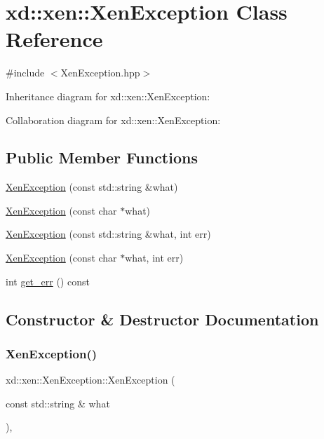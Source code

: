 \hypertarget{classxd_1_1xen_1_1_xen_exception}{}\section{xd\+:\+:xen\+:\+:Xen\+Exception Class Reference}
\label{classxd_1_1xen_1_1_xen_exception}


{\ttfamily \#include $<$Xen\+Exception.\+hpp$>$}



Inheritance diagram for xd\+:\+:xen\+:\+:Xen\+Exception\+:


Collaboration diagram for xd\+:\+:xen\+:\+:Xen\+Exception\+:
\subsection*{Public Member Functions}
\begin{DoxyCompactItemize}
\item 
\mbox{\hyperlink{classxd_1_1xen_1_1_xen_exception_ace9d3d9006e69ef09baf41800c7db3d8}{Xen\+Exception}} (const std\+::string \&what)
\item 
\mbox{\hyperlink{classxd_1_1xen_1_1_xen_exception_a10121fdee15b3aeebde90123e32f113b}{Xen\+Exception}} (const char $\ast$what)
\item 
\mbox{\hyperlink{classxd_1_1xen_1_1_xen_exception_a35675029462ffd76dd1ecec315e8242f}{Xen\+Exception}} (const std\+::string \&what, int err)
\item 
\mbox{\hyperlink{classxd_1_1xen_1_1_xen_exception_a642f932b89e63f022f35f66aead6a813}{Xen\+Exception}} (const char $\ast$what, int err)
\item 
int \mbox{\hyperlink{classxd_1_1xen_1_1_xen_exception_a4595157c80ab52416f511f78c5ebb5c2}{get\+\_\+err}} () const
\end{DoxyCompactItemize}


\subsection{Constructor \& Destructor Documentation}
\mbox{\label{classxd_1_1xen_1_1_xen_exception_ace9d3d9006e69ef09baf41800c7db3d8}} 
\subsubsection{\texorpdfstring{Xen\+Exception()}{XenException()}\hspace{0.1cm}{\footnotesize\ttfamily [1/4]}}
{\footnotesize\ttfamily xd\+::xen\+::\+Xen\+Exception\+::\+Xen\+Exception (\begin{DoxyParamCaption}\item[{const std\+::string \&}]{what }\end{DoxyParamCaption})\hspace{0.3cm}{\ttfamily [inline]}, {\ttfamily [explicit]}}

